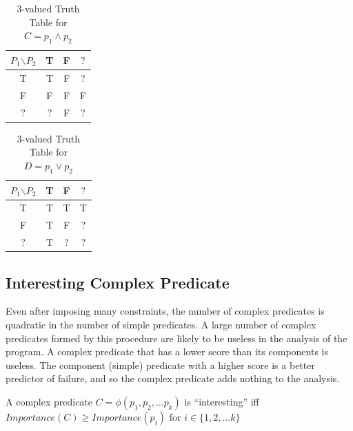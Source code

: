 \begin{table}
\nocaptionrule
\caption{3-valued Truth Table for $C = p_1 \wedge p_2$}
\label{tab:and}
\centering
\scriptsize
  
\begin{tabular}{c|ccc}
  $P_1$$\backslash$$P_2$ & T & F & $?$ \\
  \hline
  T & T & F & ? \\
  F & F & F & F \\
  ? & ? & F & ? \\
\end{tabular}
\end{table}


\begin{table}
\nocaptionrule
\caption{3-valued Truth Table for $D = p_1 \vee p_2$}
\label{tab:or}
\centering
\scriptsize
  
  \centering
  \begin{tabular}{c|ccc}
  $P_1$$\backslash$$P_2$ & T & F & $?$ \\
  \hline
  T & T & T & T \\
  F & T & F & ? \\
  ? & T & ? & ? \\
\end{tabular}
\end{table}

\subsection{Interesting Complex Predicate}

Even after imposing many constraints, the number of complex predicates is quadratic in the number of simple predicates.  A large number of complex predicates formed by this procedure are likely to be useless in the analysis of the program.  A complex predicate that has a lower score than its components is useless.  The component (simple) predicate with a higher score is a better predictor of failure, and so the complex predicate adds nothing to the analysis.

\begin{defn}
\label{dfn3}
A complex predicate $C = \phi(p_1, p_2, \ldots p_k)$ is ``interesting'' iff $Importance(C) \geq Importance(p_i)$ for $i \in \{1, 2, \ldots k\}$
\end{defn}

